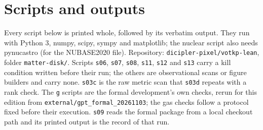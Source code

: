 





\section{Scripts and outputs}
Every script below is printed whole, followed by its verbatim output. They run with Python 3, numpy, scipy, sympy and matplotlib; the nuclear script also needs pynucastro (for the NUBASE2020 file). Repository: \texttt{dicipler-pixel/votkp-lean}, folder \texttt{matter-disk/}. Scripts \texttt{s06}, \texttt{s07}, \texttt{s08}, \texttt{s11}, \texttt{s12} and \texttt{s13} carry a kill condition written before their run; the others are observational scans or figure builders and carry none. \texttt{s03c} is the raw metric scan that \texttt{s03d} repeats with a rank check. The \texttt{g} scripts are the formal development's own checks, rerun for this edition from \texttt{external/gpt\_formal\_20261103}; the gas checks follow a protocol fixed before their execution. \texttt{s09} reads the formal package from a local checkout path and its printed output is the record of that run.

